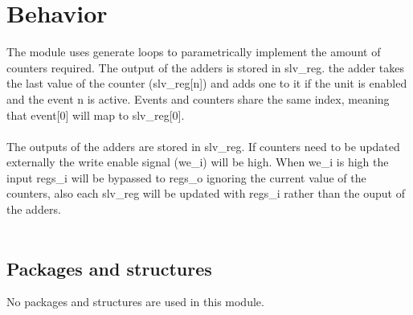 \section{Behavior}
The module uses generate loops to parametrically implement the amount of counters required. The output of the adders is stored in slv\_reg. the adder takes the last value of the counter (slv\_reg[n]) and adds one to it if the unit is enabled and the event n is active. Events and counters share the same index, meaning that event[0] will map to  slv\_reg[0].\\
\\
The outputs of the adders are stored in slv\_reg. If counters need to be updated externally the write enable signal (we\_i) will be high. When we\_i is high the input regs\_i will be bypassed to regs\_o ignoring the current value of the counters, also each slv\_reg will be updated with regs\_i rather than the ouput of the adders.\\
\\
\subsection{Packages and structures}

No packages and structures are used in this module.

